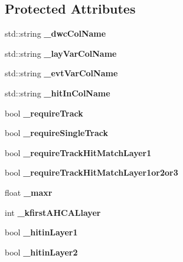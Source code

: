 \subsection*{Protected Attributes}
\begin{DoxyCompactItemize}
\item 
std\-::string {\bfseries \-\_\-dwc\-Col\-Name}\label{classCALICE_1_1EventFilter_a125afd6f12ac67cf85e8e934c0f3e62d}

\item 
std\-::string {\bfseries \-\_\-lay\-Var\-Col\-Name}\label{classCALICE_1_1EventFilter_a2654d519a99b4207fb6424c20acec14b}

\item 
std\-::string {\bfseries \-\_\-evt\-Var\-Col\-Name}\label{classCALICE_1_1EventFilter_a22fdcdb3082038cd84e92d0180caa219}

\item 
std\-::string {\bfseries \-\_\-hit\-In\-Col\-Name}\label{classCALICE_1_1EventFilter_a2dd9d43340604af34fc3d2553d2b02c4}

\item 
bool {\bfseries \-\_\-require\-Track}\label{classCALICE_1_1EventFilter_ab329b6100f8862bb050c56b389f65c45}

\item 
bool {\bfseries \-\_\-require\-Single\-Track}\label{classCALICE_1_1EventFilter_a4d4aba71b20ca1b2862db0d75d51821d}

\item 
bool {\bfseries \-\_\-require\-Track\-Hit\-Match\-Layer1}\label{classCALICE_1_1EventFilter_a93b8d4780b17e2d2fc070db71e6b6c8c}

\item 
bool {\bfseries \-\_\-require\-Track\-Hit\-Match\-Layer1or2or3}\label{classCALICE_1_1EventFilter_a9d7277aae041df1fc56f8603c5f2fe9e}

\item 
float {\bfseries \-\_\-maxr}\label{classCALICE_1_1EventFilter_a6c208e4a94adf820fcb8da72c384620a}

\item 
int {\bfseries \-\_\-kfirst\-A\-H\-C\-A\-Llayer}\label{classCALICE_1_1EventFilter_ad27c08374fb865409fb2316e12111992}

\item 
bool {\bfseries \-\_\-hitin\-Layer1}\label{classCALICE_1_1EventFilter_a76a1915d609bb8217d07c80ba988b489}

\item 
bool {\bfseries \-\_\-hitin\-Layer2}\label{classCALICE_1_1EventFilter_a262a3a3a6c20df71fad5104eee4ff237}


\end{DoxyCompactItemize}
